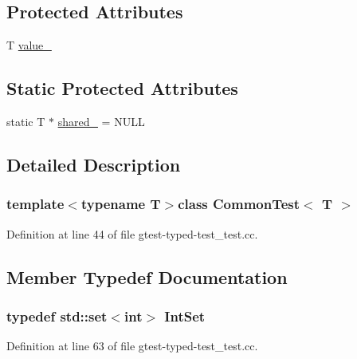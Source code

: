 \subsection*{\-Protected \-Attributes}
\begin{DoxyCompactItemize}
\item 
\-T \hyperlink{classCommonTest_ae496c0f6edafccdab7ef2e2b9d0c7e03}{value\-\_\-}
\end{DoxyCompactItemize}
\subsection*{\-Static \-Protected \-Attributes}
\begin{DoxyCompactItemize}
\item 
static \-T $\ast$ \hyperlink{classCommonTest_a010d6ea1d71d7d6ba83d605dcde333af}{shared\-\_\-} = \-N\-U\-L\-L
\end{DoxyCompactItemize}


\subsection{\-Detailed \-Description}
\subsubsection*{template$<$typename T$>$class Common\-Test$<$ T $>$}



\-Definition at line 44 of file gtest-\/typed-\/test\-\_\-test.\-cc.



\subsection{\-Member \-Typedef \-Documentation}
\hypertarget{classCommonTest_a073e9926e51139db1741b866f0bcdd48}{
\subsubsection[{\-Int\-Set}]{\setlength{\rightskip}{0pt plus 5cm}typedef std\-::set$<$int$>$ {\bf \-Int\-Set}}}\label{de/d53/classCommonTest_a073e9926e51139db1741b866f0bcdd48}


\-Definition at line 63 of file gtest-\/typed-\/test\-\_\-test.\-cc.

